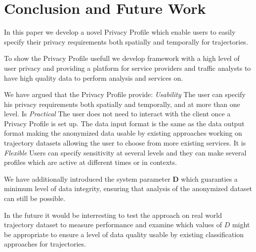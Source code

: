 \section{Conclusion and Future Work}\label{sec:future}

In this paper we develop a novel Privacy Profile which enable users to easily specify their privacy requirements both spatially and temporally for trajectories.

To show the Privacy Profile usefull we develop framework with a high level of user privacy and providing a platform for service providers and traffic analysts to have high quality data to perform analysis and services on.

We have argued that the Privacy Profile provide: 
{\it Usability} The user can specify his privacy requirements both spatially and temporally, and at more than one level. Is {\it Practical} The user does not need to interact with the client once a Privacy Profile is set up. The data input format is the same as the data output format making the anonymized data usable by existing approaches working on trajectory datasets allowing the user to choose from more existing services. It is {\it Flexible} Users can specify sensitivity at several levels and they can make several profiles which are active at different times or in contexts.

We have additionally introduced the system parameter $\mathbf{D}$ which guaranties a minimum level of data integrity, ensuring that analysis of the anonymized dataset can still be possible.

In the future it would be interresting to test the approach on real world trajectory dataset to measure performance and examine which values of $D$ might be appropriate to ensure a level of data quality usable by existing classification approaches for trajectories.



